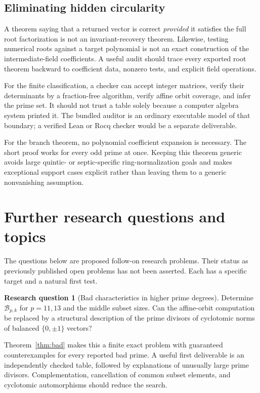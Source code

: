 \documentclass[11pt,a4paper]{article}
\theoremstyle{definition}
\newtheorem{question}[theorem]{Research question}
\theoremstyle{remark}
\begin{document}
\subsection{Eliminating hidden circularity}

A theorem saying that a returned vector is correct \emph{provided} it
satisfies the full root factorization is not an invariant-recovery theorem.
Likewise, testing numerical roots against a target polynomial is not an
exact construction of the intermediate-field coefficients. A useful audit
should trace every exported root theorem backward to coefficient data,
nonzero tests, and explicit field operations.

For the finite classification, a checker can accept integer matrices,
verify their determinants by a fraction-free algorithm, verify affine orbit
coverage, and infer the prime set. It should not trust a table solely
because a computer algebra system printed it. The bundled auditor is an
ordinary executable model of that boundary; a verified Lean or Rocq checker
would be a separate deliverable.

For the branch theorem, no polynomial coefficient expansion is necessary.
The short proof works for every odd prime at once. Keeping this theorem
generic avoids large quintic- or septic-specific ring-normalization goals
and makes exceptional support cases explicit rather than leaving them to a
generic nonvanishing assumption.

\section{Further research questions and topics}
\label{sec:questions}

The questions below are proposed follow-on research problems. Their status
as previously published open problems has not been asserted. Each has a
specific target and a natural first test.

\begin{question}[Bad characteristics in higher prime degrees]
Determine $\mathcal B_{p,k}$ for $p=11,13$ and the middle subset sizes.
Can the affine-orbit computation be replaced by a structural description
of the prime divisors of cyclotomic norms of balanced $\{0,\pm1\}$ vectors?
\end{question}
Theorem~\ref{thm:bad} makes this a finite exact problem with guaranteed
counterexamples for every reported bad prime. A useful first deliverable is
an independently checked table, followed by explanations of unusually
large prime divisors. Complementation, cancellation of common subset
elements, and cyclotomic automorphisms should reduce the search.
\end{document}
